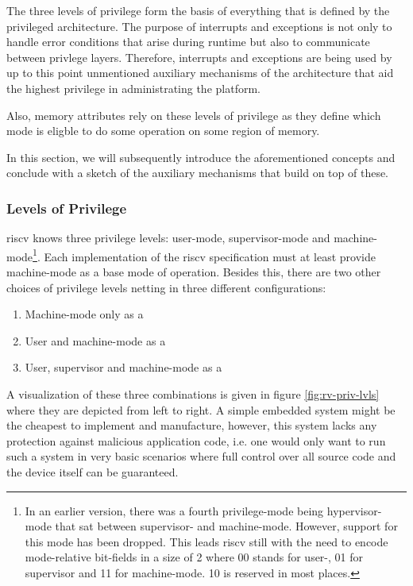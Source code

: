 The three levels of privilege form the basis of everything that is defined by the privileged architecture.
The purpose of interrupts and exceptions is not only to handle error conditions that arise during runtime but also to communicate between privlege layers.
Therefore, interrupts and exceptions are being used by up to this point unmentioned auxiliary mechanisms of the architecture that aid the highest privilege in administrating the platform.

Also, memory attributes rely on these levels of privilege as they define which mode is eligble to do some operation on some region of memory.

In this section, we will subsequently introduce the aforementioned concepts and conclude with a sketch of the auxiliary mechanisms that build on top of these.

\subsubsection{Levels of Privilege}

\gls{riscv} knows three privilege levels: user-mode, supervisor-mode and machine-mode\footnote{%
    In an earlier version, there was a fourth privilege-mode being hypervisor-mode that sat between supervisor- and machine-mode.
    However, support for this mode has been dropped.
    This leads \gls{riscv} still with the need to encode mode-relative bit-fields in a size of 2 where 00 stands for user-, 01 for supervisor and 11 for machine-mode.
    10 is reserved in most places.
}.
Each implementation of the \gls{riscv} specification must at least provide machine-mode as a base mode of operation.
Besides this, there are two other choices of privilege levels netting in three different configurations:
\begin{enumerate}
    \item Machine-mode only as a 
    \item User and machine-mode as a 
    \item User, supervisor and machine-mode as a 
\end{enumerate}

A visualization of these three combinations is given in figure \ref{fig:rv-priv-lvls} where they are depicted from left to right.
A simple embedded system might be the cheapest to implement and manufacture, however, this system lacks any protection against malicious application code, i.e. one would only want to run such a system in very basic scenarios where full control over all source code and the device itself can be guaranteed.


